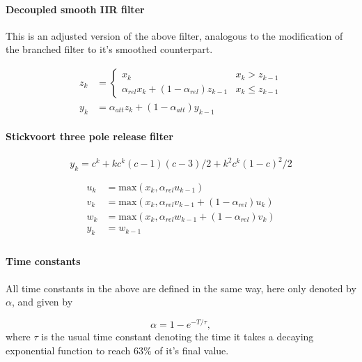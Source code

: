 \documentclass[../main2.tex]{subfiles}
\begin{document}
\paragraph{Decoupled smooth IIR filter}
This is an adjusted version of the above filter, analogous to the modification of the branched filter to it's smoothed counterpart.

\begin{equation}
\begin{split}
z_k &= \begin{cases}
    x_k 								& x_k > z_{k-1} \\
    \alpha_{rel} x_k + (1-\alpha_{rel}) z_{k-1} 	& x_k \leq z_{k-1}
\end{cases} \\
y_k &= \alpha_{att} z_k + (1-\alpha_{att}) y_{k-1}
\end{split}
\end{equation}

\paragraph{Stickvoort three pole release filter}
\begin{equation}
y_k = c^k+ k c^k (c - 1)(c - 3)/2 + k^2 c^k (1 - c)^2/2
\end{equation}

\begin{equation}
\begin{split}
u_k &= \text{max}(x_k, \alpha_{rel} u_{k-1}) \\
v_k &= \text{max}(x_k, \alpha_{rel} v_{k-1} + (1-\alpha_{rel}) u_k) \\
w_k &= \text{max}(x_k, \alpha_{rel} w_{k-1} + (1-\alpha_{rel}) v_k)\\
y_k &= w_{k-1} \\
\end{split}
\end{equation}

\paragraph{Time constants}
All time constants in the above are defined in the same way, here only denoted by $\alpha$, and given by

\begin{equation}
\alpha = 1- e^{-T/ \tau},
\end{equation}
where $\tau$ is the usual time constant denoting the time it takes a decaying exponential function to reach $63 \%$ of it's final value.
\end{document}
